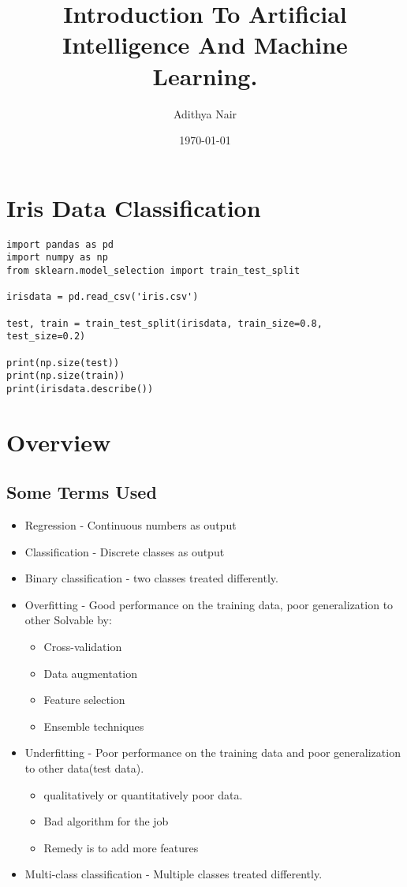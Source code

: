 \documentclass[11pt]{article}
\author{Adithya Nair}
\date{\today}
\title{Introduction To Artificial Intelligence And Machine Learning.}
\begin{document}
\maketitle
\tableofcontents

\section{Iris Data Classification}
\label{sec:org06366bd}

\begin{verbatim}
import pandas as pd
import numpy as np
from sklearn.model_selection import train_test_split

irisdata = pd.read_csv('iris.csv')

test, train = train_test_split(irisdata, train_size=0.8, test_size=0.2)

print(np.size(test))
print(np.size(train))
print(irisdata.describe())
\end{verbatim}
\section{Overview}
\label{sec:org365e2bd}
\subsection{Some Terms Used}
\label{sec:org4907177}
\begin{itemize}
\item Regression - Continuous numbers as output
\item Classification - Discrete classes as output
\item Binary classification - two classes treated differently.
\item Overfitting - Good performance on the training data, poor generalization to other
Solvable by:
\begin{itemize}
\item Cross-validation
\item Data augmentation
\item Feature selection
\item Ensemble techniques
\end{itemize}
\item Underfitting - Poor performance on the training data and poor generalization to other data(test data).
\begin{itemize}
\item qualitatively or quantitatively poor data.
\item Bad algorithm for the job
\item Remedy is to add more features
\end{itemize}
\item Multi-class classification - Multiple classes treated differently.
\end{itemize}
\end{document}
